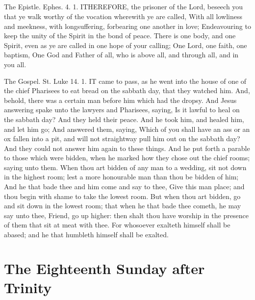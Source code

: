 \subsection{}

The Epistle. Ephes. 4. 1.
ITHEREFORE, the prisoner of the Lord, beseech you that ye walk worthy of the vocation wherewith ye are called, With all lowliness and meekness, with longsuffering, forbearing one another in love; Endeavouring to keep the unity of the Spirit in the bond of peace. There is one body, and one Spirit, even as ye are called in one hope of your calling; One Lord, one faith, one baptism, One God and Father of all, who is above all, and through all, and in you all.


The Gospel. St. Luke 14. 1.
IT came to pass, as he went into the house of one of the chief Pharisees to eat bread on the sabbath day, that they watched him. And, behold, there was a certain man before him which had the dropsy. And Jesus answering spake unto the lawyers and Pharisees, saying, Is it lawful to heal on the sabbath day? And they held their peace. And he took him, and healed him, and let him go; And answered them, saying, Which of you shall have an ass or an ox fallen into a pit, and will not straightway pull him out on the sabbath day? And they could not answer him again to these things. And he put forth a parable to those which were bidden, when he marked how they chose out the chief rooms; saying unto them. When thou art bidden of any man to a wedding, sit not down in the highest room; lest a more honourable man than thou be bidden of him; And he that bade thee and him come and say to thee, Give this man place; and thou begin with shame to take the lowest room. But when thou art bidden, go and sit down in the lowest room; that when he that bade thee cometh, he may say unto thee, Friend, go up higher: then shalt thou have worship in the presence of them that sit at meat with thee. For whosoever exalteth himself shall be abased; and he that humbleth himself shall be exalted.

\section{The Eighteenth Sunday after Trinity}
\subsection{}


